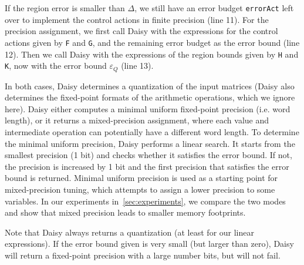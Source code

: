 
If the region error is smaller than $\Delta$, we still have an error budget \texttt{errorAct} left
over to implement the control actions in finite precision (line 11).
For the precision assignment, we first call Daisy with the expressions for the
control actions given by \texttt{F} and \texttt{G}, and the remaining error
budget as the error bound (line 12).
Then we call Daisy with the expressions of the region bounds given by \texttt{H}
and \texttt{K}, now with the error bound $\varepsilon_Q$ (line 13).

In both cases, Daisy determines a quantization of the input matrices (Daisy also
determines the fixed-point formats of the arithmetic operations, which we ignore here).
Daisy either computes a minimal uniform fixed-point precision (i.e. word length),
or it returns a mixed-precision assignment, where each value and
intermediate operation can potentially have a different word length.
To determine the minimal uniform precision, Daisy performs a linear search.
It starts from the smallest precision (1 bit) and checks whether it satisfies the
error bound. If not, the precision is increased by 1 bit and the first precision
that satisfies the error bound is returned.
Minimal uniform precision is used as a starting point for mixed-precision tuning,
which attempts to assign a lower precision to some variables. 
In our experiments in~\autoref{sec:experiments}, we compare the two modes and show
that mixed precision leads to smaller memory footprints.

Note that Daisy always returns a quantization (at least for our linear
expressions). If the error bound given is very small (but larger than zero),
Daisy will return a fixed-point precision with a large number bits, but will not
fail.


